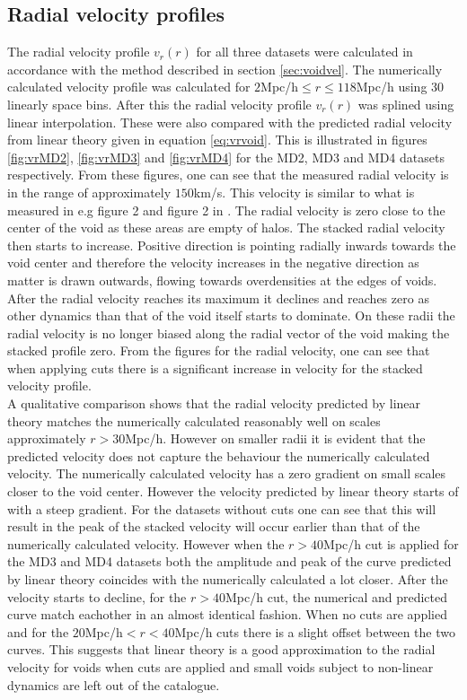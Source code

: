 \subsection{Radial velocity profiles}
The radial velocity profile $v_r(r)$ for all three datasets were calculated in accordance with the method described in section \ref{sec:voidvel}. The numerically calculated velocity profile was calculated for $2$Mpc/h$\leq r\leq 118$Mpc/h using $30$ linearly space bins. After this the radial velocity profile $v_r(r)$ was splined using linear interpolation. These were also compared with the predicted radial velocity from linear theory given in equation \ref{eq:vrvoid}. This is illustrated in figures \ref{fig:vrMD2}, \ref{fig:vrMD3} and \ref{fig:vrMD4} for the MD2, MD3 and MD4 datasets respectively. From these figures, one can see that the measured radial velocity is in the range of approximately $150$km/s. This velocity is similar to what is measured in \cite{Nadathur_2018} e.g figure 2 and figure 2 in \cite{Achitouv_streaming}. The radial velocity is zero close to the center of the void as these areas are empty of halos. The stacked radial velocity then starts to increase. Positive direction is pointing radially inwards towards the void center and therefore the velocity increases in the negative direction as matter is drawn outwards, flowing towards overdensities at the edges of voids. After the radial velocity reaches its maximum it declines and reaches zero as other dynamics than that of the void itself starts to dominate. On these radii the radial velocity is no longer biased along the radial vector of the void making the stacked profile zero. From the figures for the radial velocity, one can see that when applying cuts there is a significant increase in velocity for the stacked velocity profile. \\\indent
A qualitative comparison shows that the radial velocity predicted by linear theory matches the numerically calculated reasonably well on scales approximately $r>30$Mpc/h. However on smaller radii it is evident that the predicted velocity does not capture the behaviour the numerically calculated velocity. The numerically calculated velocity has a zero gradient on small scales closer to the void center. However the velocity predicted by linear theory starts of with a steep gradient. For the datasets without cuts one can see that this will result in the peak of the stacked velocity will occur earlier than that of the numerically calculated velocity. However when the $r>40$Mpc/h cut is applied for the MD3 and MD4 datasets both the amplitude and peak of the curve predicted by linear theory coincides with the numerically calculated a lot closer. After the velocity starts to decline, for the $r>40$Mpc/h cut, the numerical and predicted curve match eachother in an almost identical fashion. When no cuts are applied and for the $20$Mpc/h$<r<40$Mpc/h cuts there is a slight offset between the two curves. This suggests that linear theory is a good approximation to the radial velocity for voids when cuts are applied and small voids subject to non-linear dynamics are left out of the catalogue.\\\indent
